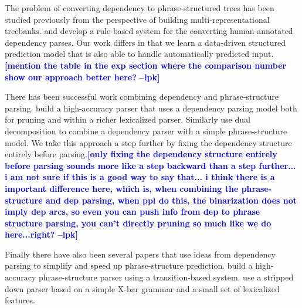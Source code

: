 \documentclass[11pt,letterpaper]{article}
\newcommand{\lpkcomment}[1]{\textcolor{blue}{\bf \small [#1 --lpk]}}
\begin{document}







The problem of converting dependency to phrase-structured trees has
been studied previously from the perspective of building
multi-representational treebanks.   and
 develop a rule-based system for the
converting human-annotated dependency parses. Our work differs in that
we learn a data-driven structured prediction model that is also able
to handle automatically predicted input.\lpkcomment{mention the table in the exp section where the comparison number show our approach better here?}

There has been successful work combining dependency and phrase-structure parsing.  build a
high-accuracy parser that uses a dependency parsing model both for
pruning and within a richer lexicalized parser. Similarly
 use dual decomposition to combine a dependency
parser with a simple phrase-structure model. We take this
approach a step further by fixing the dependency structure
entirely before parsing.\lpkcomment{only fixing the dependency structure
entirely before parsing sounds more like a step backward than a step further... i am not sure if this is a good way to say that... i think there is a important difference here, which is, when combining the phrase-structure and dep parsing, when ppl do this, the binarization does not imply dep arcs, so even you can push info from dep to phrase structure parsing, you can't directly pruning so much like we do here...right?}


Finally there have also been several papers that use ideas from
dependency parsing to simplify and speed up phrase-structure prediction.
 build a high-accuracy phrase-structure parser
using a transition-based system.  use a stripped
down parser based on a simple X-bar grammar and a small set of lexicalized features.




\end{document}

